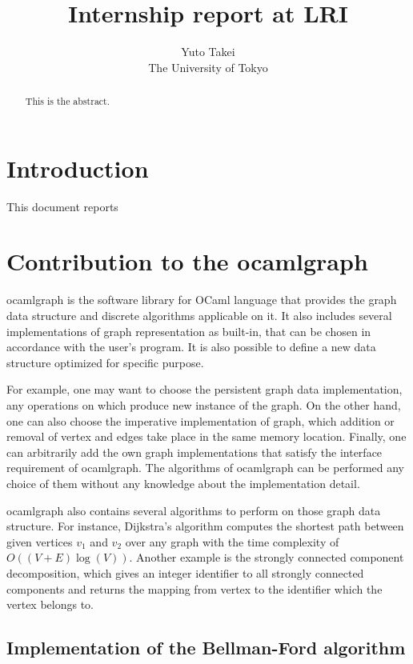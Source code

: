 \documentclass[a4paper,12pt]{article}
\title{Internship report at LRI}
\author{Yuto Takei \\ The University of Tokyo }
\begin{document}
\maketitle

\begin{abstract}
  This is the abstract.
\end{abstract}

\section{Introduction}

This document reports 

\section{Contribution to the ocamlgraph}

ocamlgraph \cite{conchon07tfp} is the software library for OCaml
language that provides the graph data structure and discrete
algorithms applicable on it. It also includes several implementations
of graph representation as built-in, that can be chosen in accordance
with the user's program. It is also possible to define a new data
structure optimized for specific purpose.

For example, one may want to choose the persistent graph data
implementation, any operations on which produce new instance of the
graph. On the other hand, one can also choose the imperative
implementation of graph, which addition or removal of vertex and edges
take place in the same memory location. Finally, one can arbitrarily
add the own graph implementations that satisfy the interface
requirement of ocamlgraph. The algorithms of ocamlgraph can be
performed any choice of them without any knowledge about the
implementation detail.

ocamlgraph also contains several algorithms to perform on those graph
data structure. For instance, Dijkstra's algorithm computes the
shortest path between given vertices $v_1$ and $v_2$ over any graph
with the time complexity of $O((V+E)\log(V))$. Another example is the
strongly connected component decomposition, which gives an integer
identifier to all strongly connected components and returns the
mapping from vertex to the identifier which the vertex belongs to.

\subsection {Implementation of the Bellman-Ford algorithm}
\end{document}
